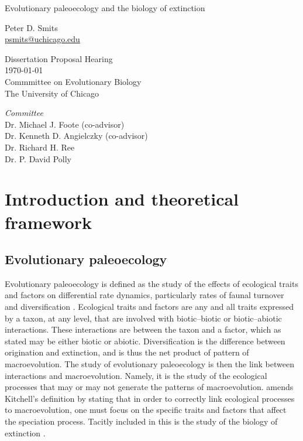 \documentclass[12pt,letterpaper]{article}
\begin{document}
\setcounter{secnumdepth}{0}

\begin{titlepage}
  \begin{center}
    \huge{Evolutionary paleoecology and the biology of extinction}

    \vspace{1.5cm}

    \large{Peter D. Smits \\}
    \footnotesize{\href{mailto:psmits@uchicago.edu}{psmits@uchicago.edu}}

    \vspace{1.5cm}

    Dissertation Proposal Hearing \\
    \today \\
    Commmittee on Evolutionary Biology \\
    The University of Chicago

    \vspace{1.5cm}

    \textit{Committee} \\
    Dr. Michael J. Foote (co-advisor) \\
    Dr. Kenneth D. Angielczky (co-advisor) \\
    Dr. Richard H. Ree \\
    Dr. P. David Polly
  \end{center}
\end{titlepage}

\linenumbers
\modulolinenumbers[2]


\section{Introduction and theoretical framework}

\subsection{Evolutionary paleoecology}
Evolutionary paleoecology is defined as the study of the effects of ecological traits and factors on differential rate dynamics, particularly rates of faunal turnover and diversification \citep{Kitchell1985a}.
Ecological traits and factors are any and all traits expressed by a taxon, at any level, that are involved with biotic--biotic or biotic--abiotic interactions. These interactions are between the taxon and a factor, which as stated may be either biotic or abiotic.
Diversification is the difference between origination and extinction, and is thus the net product of pattern of macroevolution.
The study of evolutionary paleoecology is then the link between interactions and macroevolution. Namely, it is the study of the ecological processes that may or may not generate the patterns of macroevolution.
\citet{Allmon1994} amends Kitchell's definition by stating that in order to correctly link ecological processes to macroevolution, one must focus on the specific traits and factors that affect the speciation process. Tacitly included in this is the study of the biology of extinction \citep{Kitchell1990}.
\end{document}
